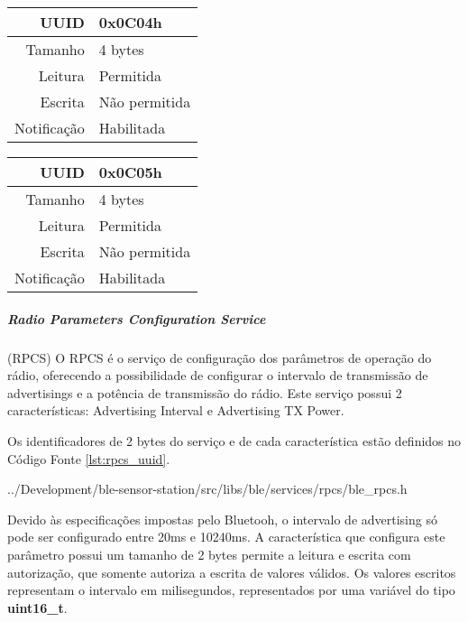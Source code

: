 \begin{tcolorbox}[arc=3mm,fontupper=\small,fonttitle=\bfseries,
subtitle style={boxrule=0.4pt, colback=white},colframe=green!25!black,
halign=center,bottom=0mm,
title=Luminosity Sensor Service]
\begin{tcbitemize}[raster columns=2,raster equal height,fontupper=\footnotesize,
	colbacktitle=yellow!100!red!100!black, coltitle=black,
	fonttitle=\footnotesize\bfseries,size=small, halign=center]
		\tcbitem [squeezed title={Pressure Data Characteristic}]
		\begin{tabular}{ r | l }
		UUID & 0x0C04h \\ \hline
		Tamanho & 4 bytes \\ \hline
		Leitura & Permitida \\ \hline
		Escrita & Não permitida \\ \hline
		Notificação & Habilitada 
		\end{tabular}
		
		\tcbitem [squeezed title={Temperature Data Characteristic}]
		\begin{tabular}{ r | l }
		UUID & 0x0C05h \\ \hline
		Tamanho & 4 bytes \\ \hline
		Leitura & Permitida \\ \hline
		Escrita & Não permitida \\ \hline
		Notificação & Habilitada 
		\end{tabular}		
	\end{tcbitemize}
	\tcblower
	\label{fig:resumo_lss}
\end{tcolorbox}

\newpage
\subparagraph{Radio Parameters Configuration Service}(RPCS) 
\newline
O RPCS é o serviço de configuração dos parâmetros de operação do rádio,
oferecendo a possibilidade de configurar o intervalo de transmissão de
advertisings e a potência de transmissão do rádio. Este serviço possui 2
características: Advertising Interval e Advertising TX Power.

Os identificadores de 2 bytes do serviço e de cada característica estão
definidos no Código Fonte \ref{lst:rpcs_uuid}. 

\begin{minipage}{0.95\linewidth}

{../Development/ble-sensor-station/src/libs/ble/services/rpcs/ble_rpcs.h}
\end{minipage}

Devido às especificações impostas pelo Bluetooh, o intervalo de advertising só
pode ser configurado entre 20ms e 10240ms\cite{ble4core}. A característica que
configura este parâmetro possui um tamanho de 2 bytes permite a leitura e
escrita com autorização, que somente autoriza a escrita de valores válidos. Os
valores escritos representam o intervalo em milisegundos, representados por uma
variável do tipo \textbf{uint16\_t}.

